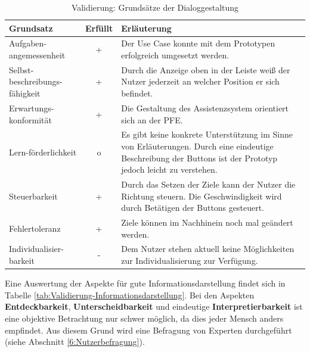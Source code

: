 \begin{table}[htb]
\caption{Validierung: Grundsätze der Dialoggestaltung}
\centering
\begin{tabular}{p{}|c|p{}}
\textbf{Grundsatz} & \textbf{Erfüllt} & \textbf{Erläuterung} \\
\hline
Aufgaben-angemessenheit & + & Der Use Case konnte mit dem Prototypen erfolgreich umgesetzt werden. \\
\hline
Selbst-beschreibungs-fähigkeit & + & Durch die Anzeige oben in der Leiste weiß der Nutzer jederzeit an welcher Position er sich befindet. \\
\hline
Erwartungs-konformität & + & Die Gestaltung des Assistenzsystem orientiert sich an der PFE.\\
\hline
Lern-förderlichkeit & o & Es gibt keine konkrete Unterstützung im Sinne von Erläuterungen. Durch eine eindeutige Beschreibung der Buttons ist der Prototyp jedoch leicht zu verstehen. \\
\hline
Steuerbarkeit & + & Durch das Setzen der Ziele kann der Nutzer die Richtung steuern. Die Geschwindigkeit wird durch Betätigen der Buttons gesteuert. \\
\hline
Fehlertoleranz & + & Ziele können im Nachhinein noch mal geändert werden. \\
\hline
Individualisier-barkeit & - & Dem Nutzer stehen aktuell keine Möglichkeiten zur Individualisierung zur Verfügung. \\
\end{tabular}
\label{tab:Validierung-Dialoggestaltung}
\end{table}

Eine Auswertung der Aspekte für gute Informationsdarstellung findet sich in Tabelle \ref{tab:Validierung-Informationsdarstellung}. Bei den Aspekten \textbf{Entdeckbarkeit}, \textbf{Unterscheidbarkeit} und eindeutige \textbf{Interpretierbarkeit} ist eine objektive Betrachtung nur schwer möglich, da dies jeder Mensch anders empfindet. Aus diesem Grund wird eine Befragung von Experten durchgeführt (siehe Abschnitt \ref{6:Nutzerbefragung}).

